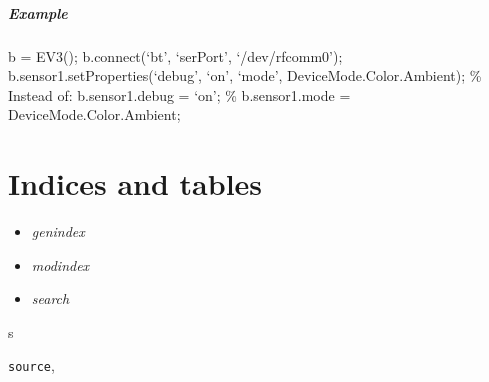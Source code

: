 \documentclass[letterpaper,10pt,english]{sphinxmanual}
\begin{document}
\begin{fulllineitems}
\begin{fulllineitems}
\begin{quote}
\begin{description}
\end{description}\end{quote}
\paragraph{Example}

b = EV3(); 
b.connect(`bt', `serPort', `/dev/rfcomm0'); 
b.sensor1.setProperties(`debug', `on', `mode', DeviceMode.Color.Ambient); 
\% Instead of: b.sensor1.debug = `on'; 
\%             b.sensor1.mode = DeviceMode.Color.Ambient; 

\end{fulllineitems}


\end{fulllineitems}



\chapter{Indices and tables}
\label{index:indices-and-tables}\begin{itemize}
\item {} 
\emph{genindex}

\item {} 
\emph{modindex}

\item {} 
\emph{search}

\end{itemize}


\renewcommand{\indexname}{MATLAB Module Index}
\begin{theindex}
\def\bigletter#1{{\Large\sffamily#1}\nopagebreak\vspace{1mm}}
\bigletter{s}
\item {\texttt{source}}, \pageref{source:module-source}
\end{theindex}

\renewcommand{\indexname}{Index}
\printindex
\end{document}
